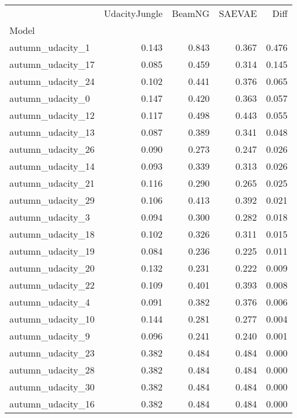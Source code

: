\begin{tabular}{lrrrr}
\toprule
{} &  UdacityJungle &  BeamNG &  SAEVAE &   Diff \\
Model             &                &         &         &        \\
\midrule
autumn\_udacity\_1  &          0.143 &   0.843 &   0.367 &  0.476 \\
autumn\_udacity\_17 &          0.085 &   0.459 &   0.314 &  0.145 \\
autumn\_udacity\_24 &          0.102 &   0.441 &   0.376 &  0.065 \\
autumn\_udacity\_0  &          0.147 &   0.420 &   0.363 &  0.057 \\
autumn\_udacity\_12 &          0.117 &   0.498 &   0.443 &  0.055 \\
autumn\_udacity\_13 &          0.087 &   0.389 &   0.341 &  0.048 \\
autumn\_udacity\_26 &          0.090 &   0.273 &   0.247 &  0.026 \\
autumn\_udacity\_14 &          0.093 &   0.339 &   0.313 &  0.026 \\
autumn\_udacity\_21 &          0.116 &   0.290 &   0.265 &  0.025 \\
autumn\_udacity\_29 &          0.106 &   0.413 &   0.392 &  0.021 \\
autumn\_udacity\_3  &          0.094 &   0.300 &   0.282 &  0.018 \\
autumn\_udacity\_18 &          0.102 &   0.326 &   0.311 &  0.015 \\
autumn\_udacity\_19 &          0.084 &   0.236 &   0.225 &  0.011 \\
autumn\_udacity\_20 &          0.132 &   0.231 &   0.222 &  0.009 \\
autumn\_udacity\_22 &          0.109 &   0.401 &   0.393 &  0.008 \\
autumn\_udacity\_4  &          0.091 &   0.382 &   0.376 &  0.006 \\
autumn\_udacity\_10 &          0.144 &   0.281 &   0.277 &  0.004 \\
autumn\_udacity\_9  &          0.096 &   0.241 &   0.240 &  0.001 \\
autumn\_udacity\_23 &          0.382 &   0.484 &   0.484 &  0.000 \\
autumn\_udacity\_28 &          0.382 &   0.484 &   0.484 &  0.000 \\
autumn\_udacity\_30 &          0.382 &   0.484 &   0.484 &  0.000 \\
autumn\_udacity\_16 &          0.382 &   0.484 &   0.484 &  0.000 \\

\end{tabular}
